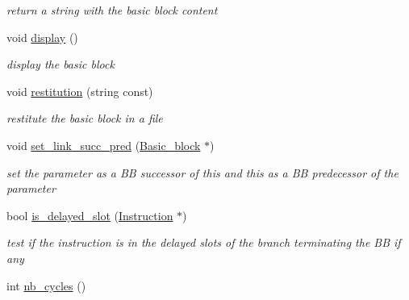 \begin{DoxyCompactItemize}
\begin{DoxyCompactList}\small\item\em return a string with the basic block content \end{DoxyCompactList}\item 
\hypertarget{class_basic__block_aad79779b098ba4ccd1549a8dbbd80d7d}{}void \hyperlink{class_basic__block_aad79779b098ba4ccd1549a8dbbd80d7d}{display} ()\label{class_basic__block_aad79779b098ba4ccd1549a8dbbd80d7d}

\begin{DoxyCompactList}\small\item\em display the basic block \end{DoxyCompactList}\item 
\hypertarget{class_basic__block_af74c4eeeecfb7a3f3fddbeb2994523a4}{}void \hyperlink{class_basic__block_af74c4eeeecfb7a3f3fddbeb2994523a4}{restitution} (string const)\label{class_basic__block_af74c4eeeecfb7a3f3fddbeb2994523a4}

\begin{DoxyCompactList}\small\item\em restitute the basic block in a file \end{DoxyCompactList}\item 
\hypertarget{class_basic__block_acb9b80088751bcf4329b3d1532f724ac}{}void \hyperlink{class_basic__block_acb9b80088751bcf4329b3d1532f724ac}{set\+\_\+link\+\_\+succ\+\_\+pred} (\hyperlink{class_basic__block}{Basic\+\_\+block} $\ast$)\label{class_basic__block_acb9b80088751bcf4329b3d1532f724ac}

\begin{DoxyCompactList}\small\item\em set the parameter as a B\+B successor of this and this as a B\+B predecessor of the parameter \end{DoxyCompactList}\item 
\hypertarget{class_basic__block_ad156275e42428ee703ffa0aa3e8b5bb0}{}bool \hyperlink{class_basic__block_ad156275e42428ee703ffa0aa3e8b5bb0}{is\+\_\+delayed\+\_\+slot} (\hyperlink{class_instruction}{Instruction} $\ast$)\label{class_basic__block_ad156275e42428ee703ffa0aa3e8b5bb0}

\begin{DoxyCompactList}\small\item\em test if the instruction is in the delayed slots of the branch terminating the B\+B if any \end{DoxyCompactList}\item 
\hypertarget{class_basic__block_a0a9caa9a904adc7807e390308e7b939c}{}int \hyperlink{class_basic__block_a0a9caa9a904adc7807e390308e7b939c}{nb\+\_\+cycles} ()\label{class_basic__block_a0a9caa9a904adc7807e390308e7b939c}


\end{DoxyCompactItemize}
